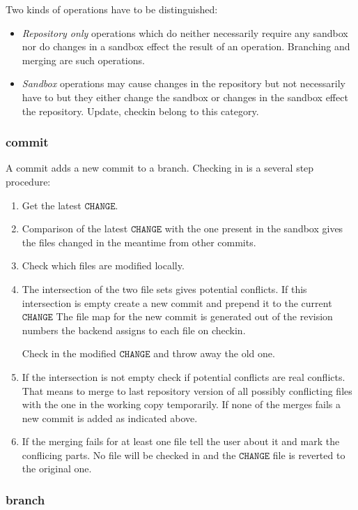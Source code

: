 \documentclass[fleqn, 10pt, a4paper]{report} \usepackage{amssymb}
\begin{document}
Two kinds of operations have to be distinguished:
\begin{itemize}
\item \emph{Repository only} operations which do neither necessarily
  require any sandbox nor do changes in a sandbox effect the result of
  an operation.  Branching and merging are such operations.
\item \emph{Sandbox} operations may cause changes in the repository
  but not necessarily have to but they either change the sandbox or
  changes in the sandbox effect the repository. Update, checkin belong
  to this category.
\end{itemize}


\subsubsection{commit}

A commit adds a new commit to a branch. Checking in is a several step
procedure:

\begin{enumerate}
\item Get the latest $\mathtt{CHANGE}$.
\item Comparison of the latest $\mathtt{CHANGE}$ with the one present
  in the sandbox gives the files changed in the meantime from other
  commits.
\item Check which files are modified locally.
\item The intersection of the two file sets gives potential conflicts.
  If this intersection is empty create a new commit and prepend it to
  the current $\mathtt{CHANGE}$ The file map for the new commit is
  generated out of the revision numbers the backend assigns to each
  file on checkin.

  Check in the modified $\mathtt{CHANGE}$ and throw away the old one.
\item If the intersection is not empty check if potential conflicts
  are real conflicts. That means to merge to last repository version
  of all possibly conflicting files with the one in the working copy
  temporarily. If none of the merges fails a new commit is added as
  indicated above.
\item If the merging fails for at least one file tell the user about
  it and mark the conflicing parts. No file will be checked in and the
  $\mathtt{CHANGE}$ file is reverted to the original one.
\end{enumerate}


\subsubsection{branch}
\end{document}
